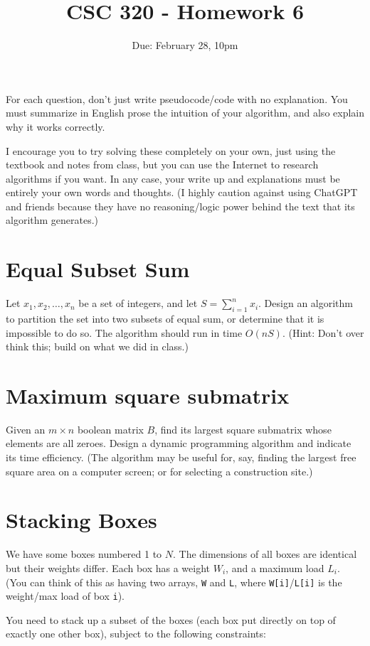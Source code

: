 \documentclass[12pt]{article}
\title{CSC 320 - Homework 6}
\author{}
\date{Due: February 28, 10pm}
\begin{document}

For each question, don't just write pseudocode/code with no explanation. You must summarize in English prose the intuition of your algorithm, and also explain why it works correctly.

I encourage you to try solving these completely on your own, just using the textbook and notes from class, but you can use the Internet to research algorithms if you want. In any case, your write up and explanations must be entirely your own words and thoughts. (I highly caution against using ChatGPT and friends because they have no reasoning/logic power behind the text that its algorithm generates.)


\section{Equal Subset Sum}

Let $x_1, x_2, \ldots, x_n$ be a set of integers, and let $S = \sum_{i=1}^n x_i$. Design an algorithm to partition the set into two subsets of equal sum, or determine that it is impossible to do so. The algorithm should run in time $O(n S)$. (Hint: Don't over think this; build on what we did in class.)


\section{Maximum square submatrix}

Given an $m \times n$ boolean matrix $B$, find its largest square submatrix whose elements are all zeroes. Design a dynamic programming algorithm and indicate its time efficiency. (The algorithm may be useful for, say, finding the largest free square area on a computer screen; or for selecting a construction site.)


\section{Stacking Boxes}

We have some boxes numbered 1 to $N$. The dimensions of all boxes are identical but their weights differ. Each box has a weight $W_i$, and a maximum load $L_i$. (You can think of this as having two arrays, \verb+W+ and \verb+L+, where \verb+W[i]+/\verb+L[i]+ is the weight/max load of box \verb+i+).

You need to stack up a subset of the boxes (each box put directly on top of exactly one other box), subject to the following constraints:
\end{document}
